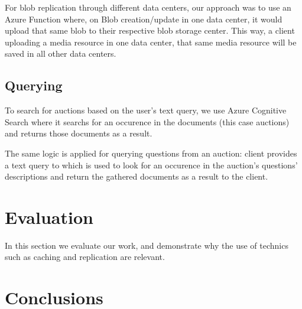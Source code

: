 \documentclass[runningheads]{llncs}
\begin{document}
For blob replication through different data centers, our approach was to use an Azure Function where, on Blob creation/update in one data center, it would upload that same blob to their respective blob storage center. This way, a client uploading a media resource in one data center, that same media resource will be saved in all other data centers.

\subsection{Querying}

To search for auctions based on the user's text query, we use Azure Cognitive Search where it searchs for an occurence in the documents (this case auctions) and returns those documents as a result.

The same logic is applied for querying questions from an auction: client provides a text query to which is used to look for an occurence in the auction's questions' descriptions and return the gathered documents as a result to the client.

\section{Evaluation}

In this section we evaluate our work, and demonstrate why the use of technics such as caching and replication are relevant.


\section{Conclusions}

\end{document}

